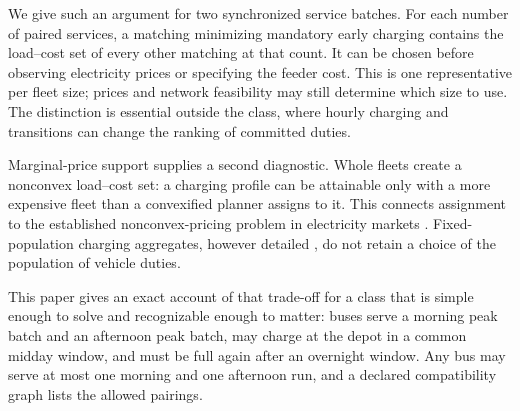 \documentclass[11pt]{article}
\theoremstyle{definition}\newtheorem{definition}[theorem]{Definition}
\theoremstyle{remark}\newtheorem{remark}[theorem]{Remark}
\begin{document}
We give such an argument for two synchronized service batches. For each
number of paired services, a matching minimizing mandatory early charging
contains the load--cost set of every other matching at that count. It can be
chosen before observing electricity prices or specifying the feeder cost.
This is one representative per fleet size; prices and network feasibility
may still determine which size to use. The distinction is essential outside
the class, where hourly charging and transitions can change the ranking of
committed duties.

Marginal-price support supplies a second diagnostic. Whole fleets create a
nonconvex load--cost set: a charging profile can be attainable only with a
more expensive fleet than a convexified planner assigns to it. This connects
assignment to the established nonconvex-pricing problem in electricity
markets \citep{oneill2005,gribikHoganPope2007,huaBaldick2017,schiro2016}.
Fixed-population charging aggregates, however detailed
\citep{mukhiAbate2023exact,mukhiLohoAbate2025exact,muller2019aggregation},
do not retain a choice of the population of vehicle duties.

This paper gives an exact account of that trade-off for a class that is simple
enough to solve and recognizable enough to matter: buses serve a morning peak
batch and an afternoon peak batch, may charge at the depot in a common midday
window, and must be full again after an overnight window. Any bus may serve at
most one morning and one afternoon run, and a declared compatibility graph
lists the allowed pairings.
\end{document}
